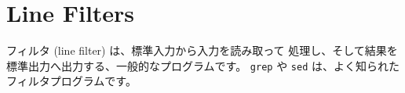 \section{Line Filters}

フィルタ (line filter) は、標準入力から入力を読み取って 処理し、そして結果を標準出力へ出力する、一般的なプログラムです。 \texttt{grep} や \texttt{sed} は、よく知られたフィルタプログラムです。





